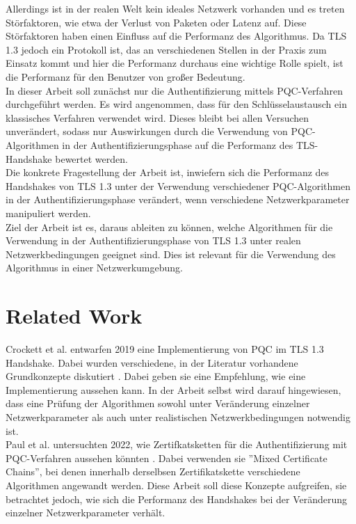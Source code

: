 	Allerdings ist in der realen Welt kein ideales Netzwerk vorhanden und es treten Störfaktoren, wie etwa der Verlust von Paketen oder Latenz auf. Diese Störfaktoren haben einen Einfluss auf die Performanz des Algorithmus. Da TLS 1.3 jedoch ein Protokoll ist, das an verschiedenen Stellen in der Praxis zum Einsatz kommt und hier die Performanz durchaus eine wichtige Rolle spielt, ist die Performanz für den Benutzer von großer Bedeutung.\\
	
	In dieser Arbeit soll zunächst nur die Authentifizierung mittels PQC-Verfahren durchgeführt werden. Es wird angenommen, dass für den Schlüsselaustausch ein klassisches Verfahren verwendet wird. Dieses bleibt bei allen Versuchen unverändert, sodass nur Auswirkungen durch die Verwendung von PQC-Algorithmen in der Authentifizierungsphase auf die Performanz des TLS-Handshake bewertet werden.\\
	
	Die konkrete Fragestellung der Arbeit ist, inwiefern sich die Performanz des Handshakes von TLS 1.3 unter der Verwendung verschiedener PQC-Algorithmen in der Authentifizierungsphase verändert, wenn verschiedene Netzwerkparameter manipuliert werden.\\
	
	Ziel der Arbeit ist es, daraus ableiten zu können, welche Algorithmen für die Verwendung in der Authentifizierungsphase von TLS 1.3 unter realen Netzwerkbedingungen geeignet sind. Dies ist relevant für die Verwendung des Algorithmus in einer Netzwerkumgebung.

	\section{Related Work}
	\label{sec:einleitung:related}
	
	Crockett et al. entwarfen 2019 eine Implementierung von PQC im TLS 1.3 Handshake. Dabei wurden verschiedene, in der Literatur vorhandene Grundkonzepte diskutiert \cite{Crockett2019}. Dabei geben sie eine Empfehlung, wie eine Implementierung aussehen kann. In der Arbeit selbst wird darauf hingewiesen, dass eine Prüfung der Algorithmen sowohl unter Veränderung einzelner Netzwerkparameter als auch unter realistischen Netzwerkbedingungen notwendig ist.\\
	
	Paul et al. untersuchten 2022, wie Zertifkatsketten für die Authentifizierung mit PQC-Verfahren aussehen könnten \cite{Paul2022}. Dabei verwenden sie ''Mixed Certificate Chains'', bei denen innerhalb derselbsen Zertifikatskette verschiedene Algorithmen angewandt werden. Diese Arbeit soll diese Konzepte aufgreifen, sie betrachtet jedoch, wie sich die Performanz des Handshakes bei der Veränderung einzelner Netzwerkparameter verhält.\\
	
